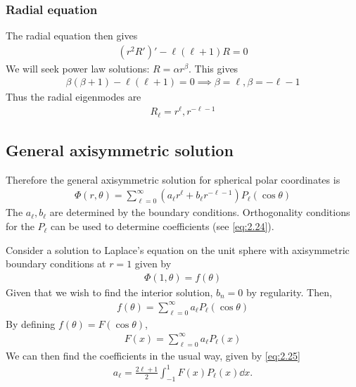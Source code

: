 \subsubsection{Radial equation}
The radial equation then gives
\begin{align*}
	(r^2 R')' - \ell (\ell + 1) R = 0
\end{align*}
We will seek power law solutions: $R = \alpha r^\beta$.
This gives
\begin{align*}
	\beta(\beta + 1) - \ell(\ell + 1) = 0 \implies \beta = \ell, \beta = -\ell - 1
\end{align*}
Thus the radial eigenmodes are
\begin{align*}
	R_\ell = r^{\ell}, r^{-\ell - 1}
\end{align*}

\subsection{General axisymmetric solution}
Therefore the general axisymmetric solution for spherical polar coordinates is
\begin{align} \label{eq:5.15}
	\Phi(r,\theta) = \sum_{\ell = 0}^\infty (a_\ell r^{\ell} + b_\ell r^{-\ell - 1}) P_\ell(\cos\theta)
\end{align}
The $a_\ell, b_\ell$ are determined by the boundary conditions.
Orthogonality conditions for the $P_\ell$ can be used to determine coefficients (see \cref{eq:2.24}).

\begin{example}
	Consider a solution to Laplace's equation on the unit sphere with axisymmetric boundary conditions at $r = 1$ given by
	\begin{align*}
		\Phi(1,\theta) = f(\theta)
	\end{align*}
	Given that we wish to find the interior solution, $b_n = 0$ by regularity.
	Then,
	\begin{align*}
		f(\theta) = \sum_{\ell=0}^\infty a_\ell P_\ell(\cos\theta)
	\end{align*}
	By defining $f(\theta) = F(\cos\theta)$,
	\begin{align*}
		F(x) = \sum_{\ell=0}^\infty a_\ell P_\ell(x)
	\end{align*}
	We can then find the coefficients in the usual way, given by \cref{eq:2.25}
	\begin{align*}
		a_\ell = \frac{2\ell + 1}{2} \int_{-1}^1 F(x) P_{\ell}(x) \dd{x}.
	\end{align*}
\end{example} 

